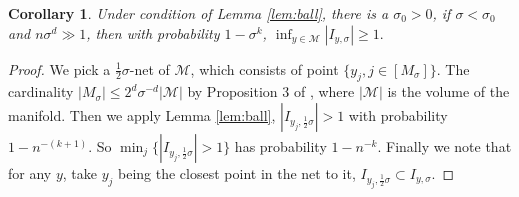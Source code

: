 \documentclass{article}
\newtheorem{cor}{Corollary}[theorem]
\def\calM{\mathcal{M}}
\begin{document}
\begin{cor}
Under condition of Lemma \ref{lem:ball}, there is a $\sigma_0>0$, if $\sigma<\sigma_0$ and  $n\sigma^{d}\gg 1$, then with probability $1-\sigma^k$, $\inf_{y\in\calM}|I_{y,\sigma}|\geq  1.$
\end{cor}
\begin{proof}
We pick a $\tfrac12\sigma$-net of $\calM$, which consists of point $\{y_j, j\in [M_\sigma]\}$. The cardinality $|M_\sigma|\leq 2^d\sigma^{-d}|\calM|$ by Proposition 3 of \cite{azangulov2024convergence}, where $|\calM|$ is the volume of the manifold. Then we apply Lemma \ref{lem:ball}, $|I_{y_j,\tfrac12\sigma}|>1$ with probability $1-n^{-(k+1)}$. So 
$\min_j\{ |I_{y_j,\tfrac12\sigma}|>1\}$ has probability $1-n^{-k}$. Finally we note that for any $y$, take $y_j$ being the closest point in the net to it, $I_{y_j,\frac12\sigma}\subset I_{y,\sigma}$.
\end{proof}
\end{document}
